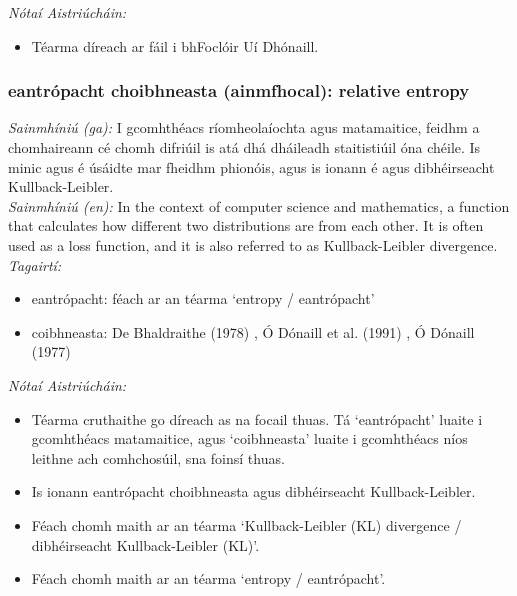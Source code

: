 \documentclass{article}
\begin{document}
 \noindent \textit{Nótaí Aistriúcháin:}
\begin{itemize}
	\item Téarma díreach ar fáil i bhFoclóir Uí Dhónaill.
\end{itemize}


\subsubsection*{eantrópacht choibhneasta (ainmfhocal): relative entropy}
 \noindent \textit{Sainmhíniú (ga):} I gcomhthéacs ríomheolaíochta agus matamaitice, feidhm a chomhaireann cé chomh difriúil is atá dhá dháileadh staitistiúil óna chéile. Is minic agus é úsáidte mar fheidhm phionóis, agus is ionann é agus dibhéirseacht Kullback-Leibler.
\\
 \noindent \textit{Sainmhíniú (en):} In the context of computer science and mathematics, a function that calculates how different two distributions are from each other. It is often used as a loss function, and it is also referred to as Kullback-Leibler divergence.
\\
 \noindent \textit{Tagairtí:}
\begin{itemize}
	\item eantrópacht: féach ar an téarma `entropy / eantrópacht'
	\item coibhneasta: De Bhaldraithe (1978) \cite{de-bhaldraithe}, Ó Dónaill et al. (1991) \cite{focloir-beag}, Ó Dónaill (1977) \cite{odonaill}
\end{itemize}

 \noindent \textit{Nótaí Aistriúcháin:}
\begin{itemize}
	\item Téarma cruthaithe go díreach as na focail thuas. Tá `eantrópacht' luaite i gcomhthéacs matamaitice, agus `coibhneasta' luaite i gcomhthéacs níos leithne ach comhchosúil, sna foinsí thuas.
	\item Is ionann eantrópacht choibhneasta agus dibhéirseacht Kullback-Leibler.
	\item Féach chomh maith ar an téarma `Kullback-Leibler (KL) divergence / dibhéirseacht Kullback-Leibler (KL)'.
	\item Féach chomh maith ar an téarma `entropy / eantrópacht'.
\end{itemize}
\end{document}

